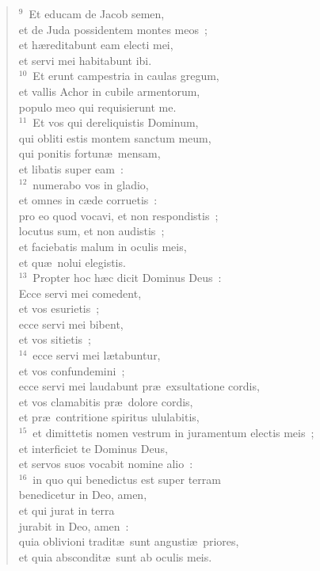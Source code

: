 \begin{verse}
${}^{9}$~Et educam de Jacob semen,\\ et de Juda possidentem montes meos~;\\ et h\ae reditabunt eam electi mei,\\ et servi mei habitabunt ibi.\\
${}^{10}$~Et erunt campestria in caulas gregum,\\ et vallis Achor in cubile armentorum,\\ populo meo qui requisierunt me.\\
${}^{11}$~Et vos qui dereliquistis Dominum,\\ qui obliti estis montem sanctum meum,\\ qui ponitis fortun\ae\ mensam,\\ et libatis super eam~:\\
${}^{12}$~numerabo vos in gladio,\\ et omnes in c\ae de corruetis~:\\ pro eo quod vocavi, et non respondistis~;\\ locutus sum, et non audistis~;\\ et faciebatis malum in oculis meis,\\ et qu\ae\ nolui elegistis.\\
${}^{13}$~Propter hoc h\ae c dicit Dominus Deus~:\\ Ecce servi mei comedent,\\ et vos esurietis~;\\ ecce servi mei bibent,\\ et vos sitietis~;\\
${}^{14}$~ecce servi mei l\ae tabuntur,\\ et vos confundemini~;\\ ecce servi mei laudabunt pr\ae\ exsultatione cordis,\\ et vos clamabitis pr\ae\ dolore cordis,\\ et pr\ae\ contritione spiritus ululabitis,\\
${}^{15}$~et dimittetis nomen vestrum in juramentum electis meis~;\\ et interficiet te Dominus Deus,\\ et servos suos vocabit nomine alio~:\\
${}^{16}$~in quo qui benedictus est super terram\\ benedicetur in Deo, amen,\\ et qui jurat in terra\\ jurabit in Deo, amen~:\\ quia oblivioni tradit\ae\ sunt angusti\ae\ priores,\\ et quia abscondit\ae\ sunt ab oculis meis.\\

\end{verse}
